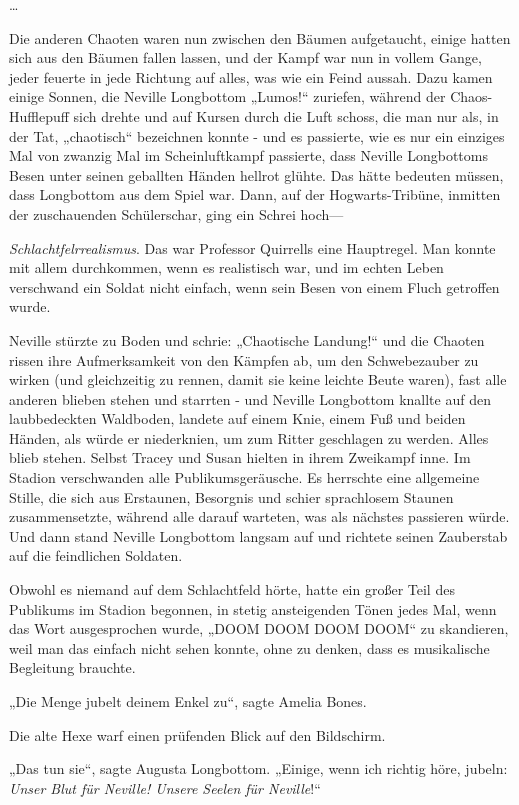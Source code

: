 {…

Die anderen Chaoten waren nun zwischen den Bäumen aufgetaucht, einige hatten sich aus den Bäumen fallen lassen, und der Kampf war nun in vollem Gange, jeder feuerte in jede Richtung auf alles, was wie ein Feind aussah. Dazu kamen einige Sonnen, die Neville Longbottom „Lumos!“ zuriefen, während der Chaos-Hufflepuff sich drehte und auf Kursen durch die Luft schoss, die man nur als, in der Tat, „chaotisch“ bezeichnen konnte - und es passierte, wie es nur ein einziges Mal von zwanzig Mal im Scheinluftkampf passierte, dass Neville Longbottoms Besen unter seinen geballten Händen hellrot glühte. Das hätte bedeuten müssen, dass Longbottom aus dem Spiel war. Dann, auf der Hogwarts-Tribüne, inmitten der zuschauenden Schülerschar, ging ein Schrei hoch—

\emph{Schlachtfelrrealismus}. Das war Professor Quirrells eine Hauptregel. Man konnte mit allem durchkommen, wenn es realistisch war, und im echten Leben verschwand ein Soldat nicht einfach, wenn sein Besen von einem Fluch getroffen wurde.

Neville stürzte zu Boden und schrie: „Chaotische Landung!“ und die Chaoten rissen ihre Aufmerksamkeit von den Kämpfen ab, um den Schwebezauber zu wirken (und gleichzeitig zu rennen, damit sie keine leichte Beute waren), fast alle anderen blieben stehen und starrten - und Neville Longbottom knallte auf den laubbedeckten Waldboden, landete auf einem Knie, einem Fuß und beiden Händen, als würde er niederknien, um zum Ritter geschlagen zu werden. Alles blieb stehen. Selbst Tracey und Susan hielten in ihrem Zweikampf inne. Im Stadion verschwanden alle Publikumsgeräusche. Es herrschte eine allgemeine Stille, die sich aus Erstaunen, Besorgnis und schier sprachlosem Staunen zusammensetzte, während alle darauf warteten, was als nächstes passieren würde. Und dann stand Neville Longbottom langsam auf und richtete seinen Zauberstab auf die feindlichen Soldaten.

Obwohl es niemand auf dem Schlachtfeld hörte, hatte ein großer Teil des Publikums im Stadion begonnen, in stetig ansteigenden Tönen jedes Mal, wenn das Wort ausgesprochen wurde, „DOOM DOOM DOOM DOOM“ zu skandieren, weil man das einfach nicht sehen konnte, ohne zu denken, dass es musikalische Begleitung brauchte.

„Die Menge jubelt deinem Enkel zu“, sagte Amelia Bones.

Die alte Hexe warf einen prüfenden Blick auf den Bildschirm.

„Das tun sie“, sagte Augusta Longbottom. „Einige, wenn ich richtig höre, jubeln: \emph{Unser Blut für Neville! Unsere Seelen für Neville}!“

}
